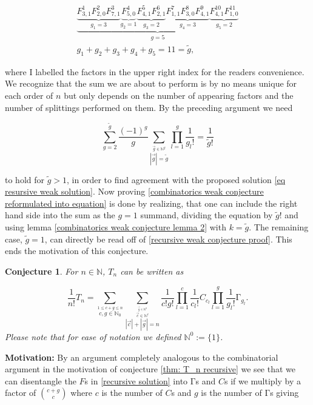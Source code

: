 \documentclass[b5paper,draft,openbib,12pt]{memoir}
\newtheorem{Conj}[Def]{Conjecture}
\begin{document}
\begin{align*}
\underbrace{\underbrace{F^1_{3,1} F^2_{2,0} F^3_{7,1}}_{g_1=3} \underbrace{F^4_{5,0}}_{g_2=1} \underbrace{F^5_{4,1} F^6_{2,1}}_{g_3=2} \underbrace{F^7_{1,1} F^8_{3,0} F^9_{4,1}}_{g_4=3} \underbrace{F^{10}_{4,1} F^{11}_{1,0}}_{g_5=2}}_{g=5}\\
 g_1+g_2+g_3+g_4+g_5=11=\tilde{g},
\end{align*}

where I labelled the factors in the upper right index for the readers convenience. We recognize
that the sum we are about to perform is by no means unique for each order of \(n\) but only 
depends on the number of appearing factors and the number of splittings performed on
them. By the preceding argument we need 

\begin{equation}\label{combinatorics weak conjecture reformulated into equation}
\sum_{g=2}^{\tilde{g}} \frac{(-1)^g}{g} \sum_{\stackrel{\vec{g}\in\mathbb{N}^g}{|\vec{g}|=\tilde{g}}} \prod_{l=1}^g \frac{1}{g_l!}
= \frac{1}{\tilde{g}!} 
\end{equation}


to hold for \(\tilde{g}>1\), in order to find agreement with the proposed solution \eqref{eq resursive weak solution}.
Now proving \eqref{combinatorics weak conjecture reformulated into equation} is done by 
realizing, that one can include the right hand side into the sum as the \(g=1\) summand, dividing
the equation by \(\tilde{g}!\) and using lemma \ref{combinatorics weak conjecture lemma 2}
with \(k=\tilde{g}\). The remaining case, \(\tilde{g}=1\), can directly be
read off of \eqref{recursive weak conjecture proof}. This ends the motivation of this conjecture.

\begin{Conj}\label{Corollary T_n by G's and C's}
For \(n\in\mathbb{N}\), \(T_n\) can be written as

\begin{equation}
\frac{1}{n!} T_n = \sum_{\stackrel{1\le c+g\le n}{c,g\in\mathbb{N}_0}} 
\sum_{\stackrel{\stackrel{\vec{g}\in\mathbb{N}^g}{\vec{c}\in\mathbb{N}^c}}{|\vec{c}| + |\vec{g}|=n}} 
\frac{1}{c! g!} \prod_{l=1}^c \frac{1}{c_l!} C_{c_l} \prod_{l=1}^g \frac{1}{g_l!} \mathrm\Gamma_{g_l}.
\end{equation}
Please note that for ease of notation we defined \(\mathbb{N}^0:= \{1\}\).
\end{Conj}
\textbf{Motivation:} By an argument completely analogous to the combinatorial argument in the motivation of conjecture
\eqref{thm: T_n recursive} we see that we can disentangle the \(F\)s in \eqref{recursive solution}
into \(\mathrm\Gamma\)s and \(C\)s if we multiply by a factor of \(\binom{c+g}{c}\) where \(c\) is the 
number of \(C\)s and \(g\) is the number of \(\mathrm\Gamma\)s giving
\end{document}
